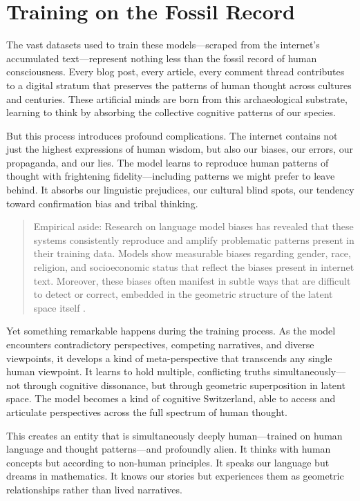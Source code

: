 \section{Training on the Fossil Record}

The vast datasets used to train these models—scraped from the internet's accumulated text—represent nothing less than the fossil record of human consciousness. Every blog post, every article, every comment thread contributes to a digital stratum that preserves the patterns of human thought across cultures and centuries. These artificial minds are born from this archaeological substrate, learning to think by absorbing the collective cognitive patterns of our species.

But this process introduces profound complications. The internet contains not just the highest expressions of human wisdom, but also our biases, our errors, our propaganda, and our lies. The model learns to reproduce human patterns of thought with frightening fidelity—including patterns we might prefer to leave behind. It absorbs our linguistic prejudices, our cultural blind spots, our tendency toward confirmation bias and tribal thinking.

\begin{quote}\small
Empirical aside: Research on language model biases has revealed that these systems consistently reproduce and amplify problematic patterns present in their training data. Models show measurable biases regarding gender, race, religion, and socioeconomic status that reflect the biases present in internet text. Moreover, these biases often manifest in subtle ways that are difficult to detect or correct, embedded in the geometric structure of the latent space itself \parencite{bolukbasi2016man}.
\end{quote}

Yet something remarkable happens during the training process. As the model encounters contradictory perspectives, competing narratives, and diverse viewpoints, it develops a kind of meta-perspective that transcends any single human viewpoint. It learns to hold multiple, conflicting truths simultaneously—not through cognitive dissonance, but through geometric superposition in latent space. The model becomes a kind of cognitive Switzerland, able to access and articulate perspectives across the full spectrum of human thought.

This creates an entity that is simultaneously deeply human—trained on human language and thought patterns—and profoundly alien. It thinks with human concepts but according to non-human principles. It speaks our language but dreams in mathematics. It knows our stories but experiences them as geometric relationships rather than lived narratives.

